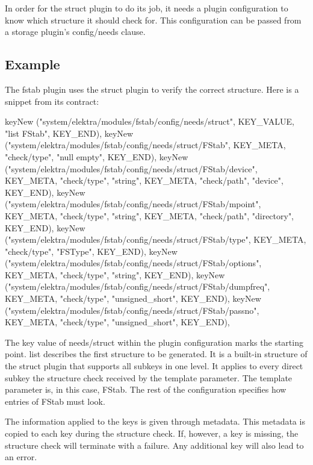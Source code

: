 In order for the {\ttfamily struct} plugin to do its job, it needs a plugin configuration to know which structure it should check for. This configuration can be passed from a storage plugin’s {\ttfamily config/needs} clause.

\subsection*{Example}

The {\ttfamily fstab} plugin uses the {\ttfamily struct} plugin to verify the correct structure. Here is a snippet from it\textquotesingle{}s contract\+: \begin{DoxyVerb}keyNew ("system/elektra/modules/fstab/config/needs/struct",
    KEY_VALUE, "list FStab",
    KEY_END),
keyNew ("system/elektra/modules/fstab/config/needs/struct/FStab",
    KEY_META, "check/type", "null empty",
    KEY_END),
keyNew ("system/elektra/modules/fstab/config/needs/struct/FStab/device",
    KEY_META, "check/type", "string",
    KEY_META, "check/path", "device",
    KEY_END),
keyNew ("system/elektra/modules/fstab/config/needs/struct/FStab/mpoint",
    KEY_META, "check/type", "string",
    KEY_META, "check/path", "directory",
    KEY_END),
keyNew ("system/elektra/modules/fstab/config/needs/struct/FStab/type",
    KEY_META, "check/type", "FSType",
    KEY_END),
keyNew ("system/elektra/modules/fstab/config/needs/struct/FStab/options",
    KEY_META, "check/type", "string",
    KEY_END),
keyNew ("system/elektra/modules/fstab/config/needs/struct/FStab/dumpfreq",
    KEY_META, "check/type", "unsigned_short",
    KEY_END), keyNew ("system/elektra/modules/fstab/config/needs/struct/FStab/passno",
    KEY_META, "check/type", "unsigned_short",
    KEY_END),
\end{DoxyVerb}


The key value of {\ttfamily needs/struct} within the plugin configuration marks the starting point. {\ttfamily list} describes the first structure to be generated. It is a built-\/in structure of the struct plugin that supports all subkeys in one level. It applies to every direct subkey the structure check received by the template parameter. The template parameter is, in this case, F\+Stab. The rest of the configuration specifies how entries of F\+Stab must look.

The information applied to the keys is given through metadata. This metadata is copied to each key during the structure check. If, however, a key is missing, the structure check will terminate with a failure. Any additional key will also lead to an error.

